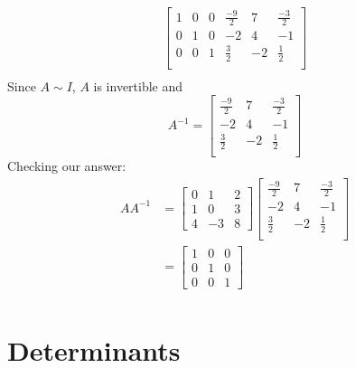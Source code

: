 \documentclass[12pt letter]{report}
\begin{document}
{{\begin{align*}
      \begin{bmatrix}
        1 & 0 & 0 & \frac{-9}{2} & 7  & \frac{-3}{2} \\
        0 & 1 & 0 & -2           & 4  & -1           \\
        0 & 0 & 1 & \frac{3}{2}  & -2 & \frac{1}{2}  \\
      \end{bmatrix}
      \\
    \end{align*}
    Since $A \sim I$, $A$ is invertible and
    \[
      A^{-1}= \begin{bmatrix}
        \frac{-9}{2} & 7  & \frac{-3}{2} \\
        -2           & 4  & -1           \\
        \frac{3}{2}  & -2 & \frac{1}{2}  \\
      \end{bmatrix}
    \]
    Checking our answer:
    \begin{align*}
      A A^{-1} & = \begin{bmatrix}
                     0 & 1  & 2 \\
                     1 & 0  & 3 \\
                     4 & -3 & 8
                   \end{bmatrix} \begin{bmatrix}
                                   \frac{-9}{2} & 7  & \frac{-3}{2} \\
                                   -2           & 4  & -1           \\
                                   \frac{3}{2}  & -2 & \frac{1}{2}  \\
                                 \end{bmatrix} \\
               & = \begin{bmatrix}
                     1 & 0 & 0 \\
                     0 & 1 & 0 \\
                     0 & 0 & 1
                   \end{bmatrix}                                \\
    \end{align*}
  }

}

\chapter{Determinants}
\end{document}
